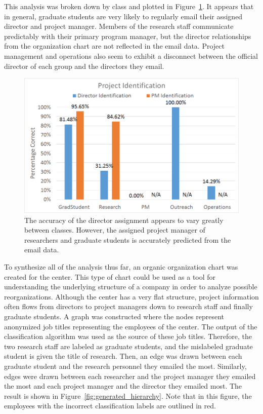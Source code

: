 \documentclass[12pt]{report}
\begin{document}
This analysis was broken down by class and plotted in Figure~\ref{fig:project_classify}.
It appears that in general, graduate students are very likely to regularly email their assigned director and project manager.
Members of the research staff communicate predictably with their primary program manager, but the director relationships from the organization chart are not reflected in the email data.
Project management and operations also seem to exhibit a disconnect between the official director of each group and the directors they email.

\begin{figure}[t]
	\centering
	\includegraphics[width=.7\columnwidth,trim={0mm 0mm 0mm 0mm},clip]{superior_identification}
	\vspace{-7pt}
	\caption[Project manager and director prediction results]{The accuracy of the director assignment appears to vary greatly between classes.  However, the assigned project manager of researchers and graduate students is accurately predicted from the email data.}
	\label{fig:project_classify}
\end{figure}

To synthesize all of the analysis thus far, an organic organization chart was created for the center.
This type of chart could be used as a tool for understanding the underlying structure of a company in order to analyze possible reorganizations.
Although the center has a very flat structure, project information often flows from directors to project managers down to research staff and finally graduate students.
A graph was constructed where the nodes represent anonymized job titles representing the employees of the center.
The output of the classification algorithm was used as the source of these job titles.
Therefore, the two research staff are labeled as graduate students, and the mislabeled graduate student is given the title of research.
Then, an edge was drawn between each graduate student and the research personnel they emailed the most.
Similarly, edges were drawn between each researcher and the project manager they emailed the most and each project manager and the director they emailed most.  The result is shown in Figure~\ref{fig:generated_hierarchy}.
Note that in this figure, the employees with the incorrect classification labels are outlined in red.
\end{document}
